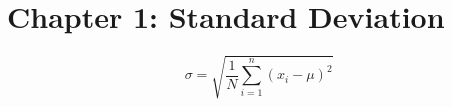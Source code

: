 \documentclass{article}
\begin{document}



\section{Chapter 1: Standard Deviation}
\[
\sigma = \sqrt{\frac{1}{N}\sum\limits_{i=1}^n (x_{i} - \mu)^2}
\]
\end{document}
